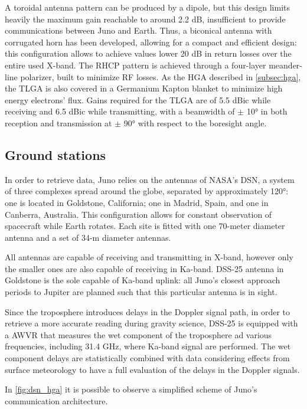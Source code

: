 A toroidal antenna pattern can be produced by a dipole, but this design limits heavily the maximum gain reachable to around 2.2 dB, insufficient to provide communications between Juno and Earth. Thus, a biconical antenna with corrugated horn has been developed, allowing for a compact and efficient design: this configuration allows to achieve values lower 20 dB in return losses over the entire used X-band\cite{telecommunication_antennas}. 
The RHCP pattern is achieved through a four-layer meander-line polarizer, built to minimize RF losses. As the HGA described in \autoref{subsec:hga}, the TLGA is also covered in a Germanium Kapton blanket to minimize high energy electrons' flux. Gains required for the TLGA are of 5.5 dBic while receiving and 6.5 dBic while transmitting, with a beamwidth of $\pm$ 10° in both reception and transmission at $\pm$ 90° with respect to the boresight angle\cite{juno_telecommunication}. 

\subsection{Ground stations}
\label{subsec:gs}

In order to retrieve data, Juno relies on the antennas of NASA's DSN, a system of three complexes spread around the globe, separated by approximately 120°: one is located in Goldstone, California; one in Madrid, Spain, and one in Canberra, Australia. This configuration allows for constant observation of spacecraft while Earth rotates\cite{juno_telecommunication}. Each site is fitted with one 70-meter diameter antenna and a set of 34-m diameter antennas. 

All antennas are capable of receiving and transmitting in X-band, however only the smaller ones are also capable of receiving in Ka-band. DSS-25 antenna in Goldstone is the sole capable of Ka-band uplink: all Juno's closest approach periods to Jupiter are planned such that this particular antenna is in sight.

Since the troposphere introduces delays in the Doppler signal path, in order to retrieve a more accurate reading during gravity science, DSS-25 is equipped with a AWVR that measures the wet component of the troposphere ad various frequencies, including 31.4 GHz, where Ka-band signal are performed. The wet component delays are statistically combined with data considering effects from surface meteorology to have a full evaluation of the delays in the Doppler signals\cite{calibration_performance}. 

In \autoref{fig:dsn_hga} it is possible to observe a simplified scheme of Juno's communication architecture.

